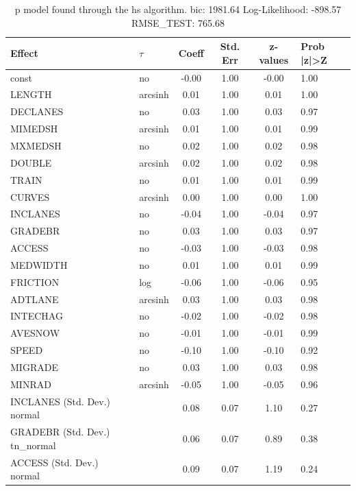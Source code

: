 \begin{table}
	\caption{p model found through the hs algorithm. bic: 1981.64 Log-Likelihood: -898.57 RMSE_TEST: 765.68}
	\begin{center}
		\begin{tabular}{|l|l|c|c|c|l|}
			\hline
			Effect & $\tau$ & Coeff & Std. Err & z-values & Prob |z|>Z \\
			\hline
			const & no & -0.00 & 1.00 & -0.00 & 1.00 \\
			\hline
			LENGTH & arcsinh & 0.01 & 1.00 & 0.01 & 1.00 \\
			\hline
			DECLANES & no & 0.03 & 1.00 & 0.03 & 0.97 \\
			\hline
			MIMEDSH & arcsinh & 0.01 & 1.00 & 0.01 & 0.99 \\
			\hline
			MXMEDSH & no & 0.02 & 1.00 & 0.02 & 0.98 \\
			\hline
			DOUBLE & arcsinh & 0.02 & 1.00 & 0.02 & 0.98 \\
			\hline
			TRAIN & no & 0.01 & 1.00 & 0.01 & 0.99 \\
			\hline
			CURVES & arcsinh & 0.00 & 1.00 & 0.00 & 1.00 \\
			\hline
			INCLANES & no & -0.04 & 1.00 & -0.04 & 0.97 \\
			\hline
			GRADEBR & no & 0.03 & 1.00 & 0.03 & 0.97 \\
			\hline
			ACCESS & no & -0.03 & 1.00 & -0.03 & 0.98 \\
			\hline
			MEDWIDTH & no & 0.01 & 1.00 & 0.01 & 0.99 \\
			\hline
			FRICTION & log & -0.06 & 1.00 & -0.06 & 0.95 \\
			\hline
			ADTLANE & arcsinh & 0.03 & 1.00 & 0.03 & 0.98 \\
			\hline
			INTECHAG & no & -0.02 & 1.00 & -0.02 & 0.98 \\
			\hline
			AVESNOW & no & -0.01 & 1.00 & -0.01 & 0.99 \\
			\hline
			SPEED & no & -0.10 & 1.00 & -0.10 & 0.92 \\
			\hline
			MIGRADE & no & 0.03 & 1.00 & 0.03 & 0.98 \\
			\hline
			MINRAD & arcsinh & -0.05 & 1.00 & -0.05 & 0.96 \\
			\hline
			INCLANES (Std. Dev.) normal &  & 0.08 & 0.07 & 1.10 & 0.27 \\
			\hline
			GRADEBR (Std. Dev.) tn_normal &  & 0.06 & 0.07 & 0.89 & 0.38 \\
			\hline
			ACCESS (Std. Dev.) normal &  & 0.09 & 0.07 & 1.19 & 0.24 \\

\end{tabular}
\end{center}
\end{table}
